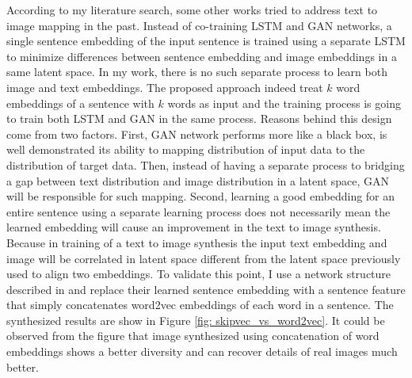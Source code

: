 \documentclass{iitthesis}
\begin{document}
According to my literature search, some other works \cite{DBLP:journals/corr/DongZMG17}\cite{reed2016generative}\cite{zhang2016stackgan} tried to address text to image mapping in the past. Instead of co-training LSTM and GAN networks, a single sentence embedding of the input sentence is trained using a separate LSTM to minimize differences between sentence embedding and image embeddings in a same latent space. In my work, there is no such separate process to learn both image and text embeddings. The proposed approach indeed treat $k$ word embeddings of a sentence with $k$ words as input and the training process is going to train both LSTM and GAN in the same process. Reasons behind this design come from two factors. First, GAN network performs more like a black box, is well demonstrated its ability to mapping distribution of input data to the distribution of target data. Then, instead of having a separate process to bridging a gap between text distribution and image distribution in a latent space, GAN will be responsible for such mapping. Second, learning a good embedding for an entire sentence using a separate learning process does not necessarily mean the learned embedding will cause an improvement in the text to image synthesis. Because in training of a text to image synthesis the input text embedding and image will be correlated in latent space different from the latent space previously used to align two embeddings. To validate this point, I use a network structure described in \cite{reed2016generative} and replace their learned sentence embedding with a sentence feature that simply concatenates word2vec embeddings of each word in a sentence. The synthesized results are show in Figure \ref{fig: skipvec_vs_word2vec}. It could be observed from the figure that image synthesized using concatenation of word embeddings shows a better diversity and can recover details of real images much better. 
\end{document}
